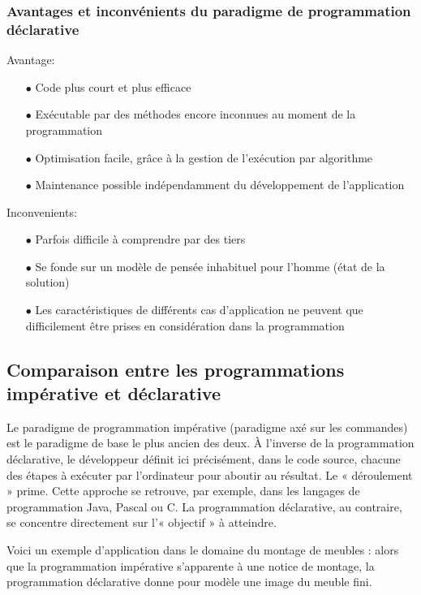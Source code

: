 \documentclass[a4paper,12pt]{article} %
\begin{document}
\subsubsection{Avantages et inconvénients du paradigme de programmation déclarative}

Avantage:
\begin{itemize}
   \item[$\bullet$]Code plus court et plus efficace
   \item[$\bullet$]Exécutable par des méthodes encore inconnues au moment de la programmation
   \item[$\bullet$]Optimisation facile, grâce à la gestion de l’exécution par algorithme
   \item[$\bullet$]Maintenance possible indépendamment du développement de l’application
\end{itemize}

Inconvenients:
\begin{itemize}
\item[$\bullet$]Parfois difficile à comprendre par des tiers
\item[$\bullet$]Se fonde sur un modèle de pensée inhabituel pour l’homme (état de la solution)
\item[$\bullet$]Les caractéristiques de différents cas d’application ne peuvent que difficilement être prises en considération dans la programmation
\end{itemize}

\subsection{Comparaison entre les programmations impérative et déclarative}

Le paradigme de programmation impérative (paradigme axé sur les commandes) est le paradigme de base le plus ancien des deux. À l’inverse de la programmation déclarative, le développeur définit ici précisément, dans le code source, chacune des étapes à exécuter par l’ordinateur pour aboutir au résultat. Le « déroulement » prime. Cette approche se retrouve, par exemple, dans les langages de programmation Java, Pascal ou C. La programmation déclarative, au contraire, se concentre directement sur l’« objectif » à atteindre.

Voici un exemple d’application dans le domaine du montage de meubles : alors que la programmation impérative s’apparente à une notice de montage, la programmation déclarative donne pour modèle une image du meuble fini.
\end{document}
